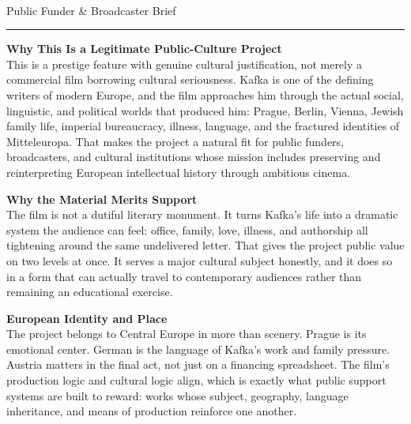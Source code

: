 \documentclass[11pt,letterpaper]{article}
\begin{document}
\begin{center}
{\Large\bfseries\sffamily \filmtitleupper}\\[3pt]
{\normalsize\sffamily\color{kafkagray} Public Funder \& Broadcaster Brief}
\end{center}
\vspace{2pt}
\textcolor{sectionrule}{\rule{\textwidth}{0.5pt}}
\vspace{4pt}

\textbf{Why This Is a Legitimate Public-Culture Project}\\
This is a prestige feature with genuine cultural justification, not merely a commercial film borrowing cultural seriousness. Kafka is one of the defining writers of modern Europe, and the film approaches him through the actual social, linguistic, and political worlds that produced him: Prague, Berlin, Vienna, Jewish family life, imperial bureaucracy, illness, language, and the fractured identities of Mitteleuropa. That makes the project a natural fit for public funders, broadcasters, and cultural institutions whose mission includes preserving and reinterpreting European intellectual history through ambitious cinema.

\vspace{2pt}

\textbf{Why the Material Merits Support}\\
The film is not a dutiful literary monument. It turns Kafka's life into a dramatic system the audience can feel: office, family, love, illness, and authorship all tightening around the same undelivered letter. That gives the project public value on two levels at once. It serves a major cultural subject honestly, and it does so in a form that can actually travel to contemporary audiences rather than remaining an educational exercise.

\vspace{2pt}

\textbf{European Identity and Place}\\
The project belongs to Central Europe in more than scenery. Prague is its emotional center. German is the language of Kafka's work and family pressure. Austria matters in the final act, not just on a financing spreadsheet. The film's production logic and cultural logic align, which is exactly what public support systems are built to reward: works whose subject, geography, language inheritance, and means of production reinforce one another.

\vspace{2pt}
\end{document}
